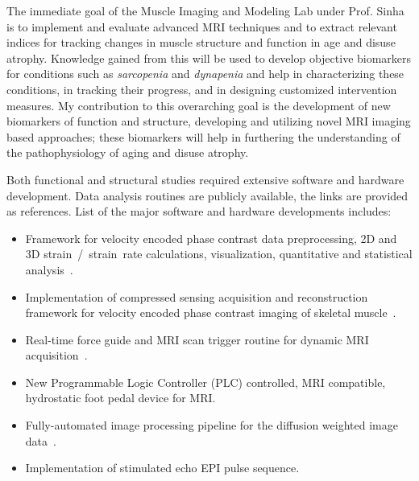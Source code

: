 The immediate goal of the Muscle Imaging and Modeling Lab under Prof. Sinha is to implement and evaluate advanced MRI techniques and to extract relevant indices for tracking changes in muscle structure and function in age and disuse atrophy. 
Knowledge gained from this will be used to develop objective biomarkers for conditions such as \textit{sarcopenia} and \textit{dynapenia} and help in characterizing these conditions, in tracking their progress, and in designing customized intervention measures. 
My contribution to this overarching goal is the development of new biomarkers of function and structure, developing and utilizing novel MRI imaging based approaches; 	these biomarkers will help in furthering the understanding of the pathophysiology of aging and disuse atrophy.

Both functional and structural studies required extensive software and hardware development. Data analysis routines are publicly available, the links are provided as references. List of the major software and hardware developments includes:
\begin{itemize}
\item Framework for velocity encoded phase contrast data preprocessing, 2D and 3D strain~/~strain~rate calculations, visualization, quantitative and statistical analysis~\cite{2DSR, 3DSR}.
\item Implementation of compressed sensing acquisition and reconstruction framework for velocity encoded phase contrast imaging of skeletal muscle~\cite{3DSR}.
\item Real-time force guide and MRI scan trigger routine for dynamic MRI acquisition~\cite{LabView}.
\item New Programmable Logic Controller (PLC) controlled, MRI compatible, hydrostatic foot pedal device for MRI.
\item Fully-automated image processing pipeline for the diffusion weighted image data~\cite{DTI}.
\item Implementation of stimulated echo EPI pulse sequence.
\end{itemize}
